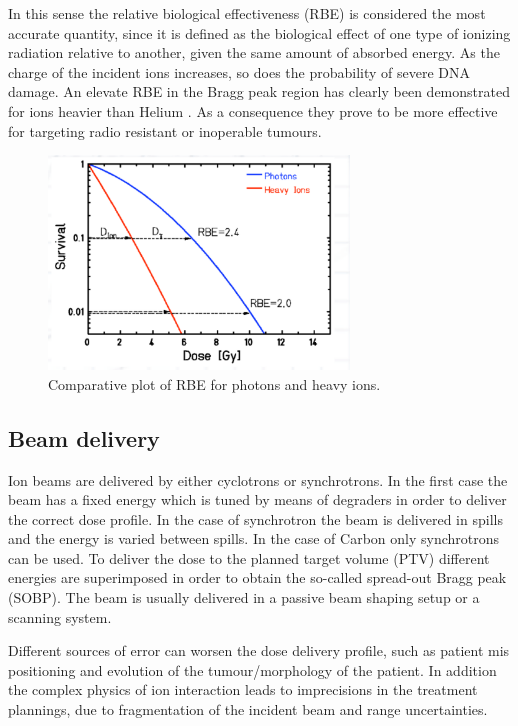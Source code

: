 In this sense the relative biological effectiveness (RBE) is considered the most accurate quantity, since it is defined as the biological effect of one type of ionizing radiation relative to another, given the same amount of absorbed energy. As the charge of the incident ions increases, so does the probability of severe DNA damage. An elevate RBE in the Bragg peak region has clearly been demonstrated for ions heavier than Helium  \cite{Linz2011}.
As a consequence they prove to be more effective for targeting radio resistant or inoperable tumours.

\begin{figure}  
\centering
\includegraphics[width=8cm]{Pictures/Chapter_1/rbe.pdf}
\caption[RBE comparison]{Comparative plot of RBE for photons and heavy ions.}
\label{fig:rbe}
\end{figure}

\subsection{Beam delivery}

Ion beams are delivered by either cyclotrons or synchrotrons. In the first case the beam has a fixed energy which is tuned by means of degraders in order to deliver the correct dose profile. In the case of synchrotron the beam is delivered in spills and the energy is varied between spills. In the case of Carbon only synchrotrons can be used.
To deliver the dose to the planned target volume (PTV) different energies are superimposed in order to obtain the so-called spread-out Bragg peak (SOBP). The beam is usually delivered in a passive beam shaping setup or a scanning system. 

Different sources of error can worsen the dose delivery profile, such as patient mis positioning and evolution of the tumour/morphology of the patient. In addition the complex physics of ion interaction leads to  imprecisions in the treatment plannings, due to fragmentation of the incident beam and range uncertainties.

